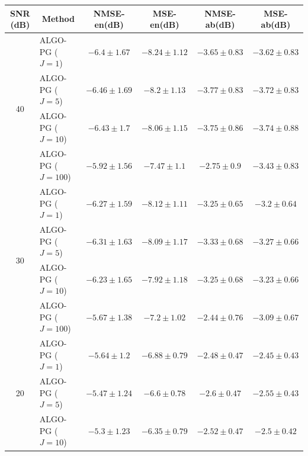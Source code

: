 \newpage

\begin{table}[h]
\centering
\begin{adjustbox}{max width=\textwidth}
\begin{tabular}{|c|l|c|c|c|c|}
\hline
SNR (dB)            & \multicolumn{1}{c|}{Method}& NMSE-en(dB)         & MSE-en(dB)          & NMSE-ab(dB)         & MSE-ab(dB)          \tabularnewline \hline
\multirow{4}{*}{40} & ALGO-PG ($J=1$)            & $-6.4     \pm 1.67$ & $-8.24    \pm 1.12$ & $-3.65    \pm 0.83$ & $-3.62    \pm 0.83$ \tabularnewline
                    & ALGO-PG ($J=5$)            & $-6.46    \pm 1.69$ & $-8.2     \pm 1.13$ & $-3.77    \pm 0.83$ & $-3.72    \pm 0.83$ \tabularnewline
                    & ALGO-PG ($J=10$)           & $-6.43    \pm 1.7$  & $-8.06    \pm 1.15$ & $-3.75    \pm 0.86$ & $-3.74    \pm 0.88$ \tabularnewline
                    & ALGO-PG ($J=100$)          & $-5.92    \pm 1.56$ & $-7.47    \pm 1.1$  & $-2.75    \pm 0.9$  & $-3.43    \pm 0.83$ \tabularnewline \hline
\multirow{4}{*}{30} & ALGO-PG ($J=1$)            & $-6.27    \pm 1.59$ & $-8.12    \pm 1.11$ & $-3.25    \pm 0.65$ & $-3.2     \pm 0.64$ \tabularnewline
                    & ALGO-PG ($J=5$)            & $-6.31    \pm 1.63$ & $-8.09    \pm 1.17$ & $-3.33    \pm 0.68$ & $-3.27    \pm 0.66$ \tabularnewline
                    & ALGO-PG ($J=10$)           & $-6.23    \pm 1.65$ & $-7.92    \pm 1.18$ & $-3.25    \pm 0.68$ & $-3.23    \pm 0.66$ \tabularnewline
                    & ALGO-PG ($J=100$)          & $-5.67    \pm 1.38$ & $-7.2     \pm 1.02$ & $-2.44    \pm 0.76$ & $-3.09    \pm 0.67$ \tabularnewline \hline
\multirow{4}{*}{20} & ALGO-PG ($J=1$)            & $-5.64    \pm 1.2$  & $-6.88    \pm 0.79$ & $-2.48    \pm 0.47$ & $-2.45    \pm 0.43$ \tabularnewline
                    & ALGO-PG ($J=5$)            & $-5.47    \pm 1.24$ & $-6.6     \pm 0.78$ & $-2.6     \pm 0.47$ & $-2.55    \pm 0.43$ \tabularnewline
                    & ALGO-PG ($J=10$)           & $-5.3     \pm 1.23$ & $-6.35    \pm 0.79$ & $-2.52    \pm 0.47$ & $-2.5     \pm 0.42$ \tabularnewline

\end{tabular}
\end{adjustbox}
\end{table}
